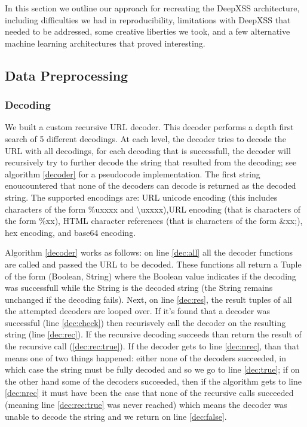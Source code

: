 In this section we outline our approach for recreating the DeepXSS architecture, including difficulties we had in reproducibility, limitations with DeepXSS that needed to be addressed, some creative liberties we took, and a few alternative machine learning architectures that proved interesting. 

\subsection{Data Preprocessing}
\subsubsection{Decoding}
We built a custom recursive URL decoder. This decoder performs a depth first search of 5 different decodings. At each level, the decoder tries to decode the URL with all decodings, for each decoding that is successfull, the decoder will recursively try to further decode the string that resulted from the decoding; see algorithm \ref{decoder} for a pseudocode implementation. The first string enoucountered that none of the decoders can decode is returned as the decoded string. The supported encodings are: URL unicode encoding (this includes characters of the form \%uxxxx and \textbackslash uxxxx),URL encoding (that is characters of the form \%xx), HTML character references (that is characters of the form \&xx;), hex encoding, and base64 encoding. 

Algorithm \ref{decoder} works as follows: on line \ref{dec:all} all the decoder functions are called and passed the URL to be decoded. These functions all return a Tuple of the form (Boolean, String) where the Boolean value indicates if the decoding was successfull while the String is the decoded string (the String remains unchanged if the decoding fails). Next, on line \ref{dec:res}, the result tuples of all the attempted decoders are looped over. If it's found that a decoder was successful (line \ref{dec:check}) then recurisvely call the decoder on the resulting string (line \ref{dec:rec}). If the recursive decoding succeeds than return the result of the recursive call (\ref{dec:rec:true}). If the decoder gets to line \ref{dec:nrec}, than that means one of two things happened: either none of the decoders succeeded, in which case the string must be fully decoded and so we go to line \ref{dec:true}; if on the other hand some of the decoders succeeded, then if the algorithm gets to line \ref{dec:nrec} it must have been the case that none of the recursive calls succeeded (meaning line \ref{dec:rec:true} was never reached) which means the decoder was unable to decode the string and we return on line \ref{dec:false}. 

